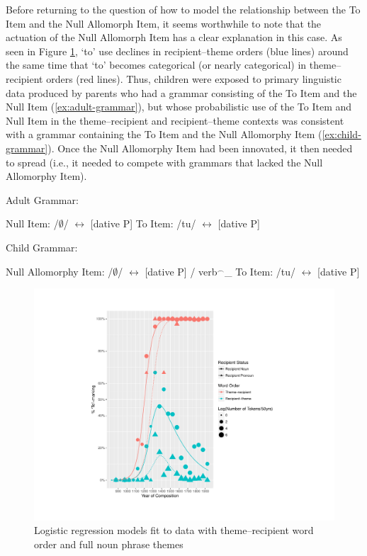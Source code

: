	Before returning to the question of how to model the relationship between the To Item and the Null Allomorph Item, it seems worthwhile to note that the actuation of the Null Allomorph Item has a clear explanation in this case. As seen in Figure \ref{fig:to-use}, `to' use declines in recipient--theme orders (blue lines) around the same time that `to' becomes categorical (or nearly categorical) in theme--recipient orders (red lines). Thus, children were exposed to primary linguistic data produced by parents who had a grammar consisting of the To Item and the Null Item (\ref{ex:adult-grammar}), but whose probabilistic use of the To Item and Null Item in the theme--recipient and recipient--theme contexts was consistent with a grammar containing the To Item and the Null Allomorphy Item (\ref{ex:child-grammar}). Once the Null Allomorphy Item had been innovated, it then needed to spread (i.e., it needed to compete with grammars that lacked the Null Allomorphy Item).

	\begin{exe}
		\ex Adult Grammar:\label{ex:adult-grammar}
		\begin{xlist}
			\ex Null Item:  /$\emptyset$/ $\leftrightarrow$ [dative P]
			\ex To Item: /tu/ $\leftrightarrow$ [dative P]
		\end{xlist}
		\ex Child Grammar:\label{ex:child-grammar}
		\begin{xlist}
			\ex Null Allomorphy Item: /$\emptyset$/ $\leftrightarrow$ [dative P] / verb$^{\smallfrown}$\_
			\ex To Item: /tu/ $\leftrightarrow$ [dative P]
		\end{xlist}
	\end{exe}

	\begin{figure}[ht!]
		\includegraphics[width=\linewidth]{../images/brit-tn}
		\caption{Logistic regression models fit to data with theme--recipient word order and full noun phrase themes}
		\label{fig:to-use}
	\end{figure}

